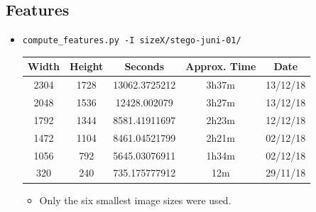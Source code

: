 \documentclass[11pt,a4paper]{report}
\begin{document}
\subsection{Features}
\begin{itemize}
\item \texttt{compute\_features.py -I sizeX/stego-juni-01/}
  \begin{center}
  \begin{tabular}{ c c | c c c }
  Width & Height & Seconds & Approx. Time & Date \\ \hline
  2304 & 1728 & 13062.3725212 & 3h37m & 13/12/18 \\
  2048 & 1536 & 12428.002079 & 3h27m & 13/12/18 \\
  1792 & 1344 & 8581.41911697 & 2h23m & 12/12/18 \\
  1472 & 1104 & 8461.04521799 & 2h21m & 02/12/18 \\
  1056 & 792 & 5645.03076911 & 1h34m & 02/12/18 \\
  320 & 240 & 735.175777912 & 12m & 29/11/18 \\
  \end{tabular}
  \end{center}
  \begin{itemize}
  \item Only the six smallest image sizes were used.
  \end{itemize}
\end{itemize}
\end{document}
